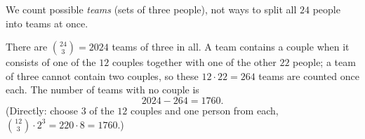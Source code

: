 We count possible \emph{teams} (sets of three people), not ways to split all $24$ people into teams at once.

There are $\binom{24}{3}=2024$ teams of three in all. A team contains a couple when it consists of one of the $12$ couples together with one of the other $22$ people; a team of three cannot contain two couples, so these $12\cdot22=264$ teams are counted once each. The number of teams with no couple is
\[
2024-264=\boxed{1760}.
\]
(Directly: choose $3$ of the $12$ couples and one person from each, $\binom{12}{3}\cdot2^3=220\cdot8=1760$.)
